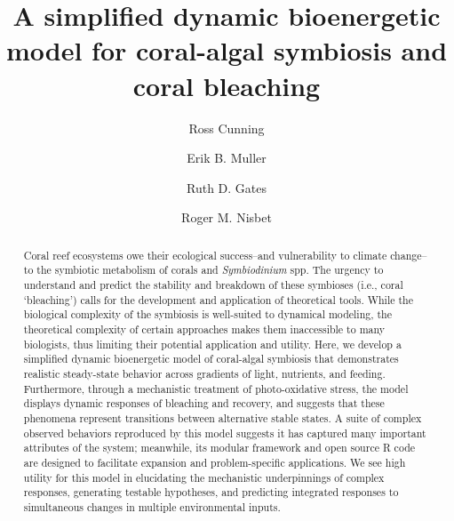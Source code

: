 \documentclass[]{elsarticle} %
\begin{document}
\begin{frontmatter}

  \title{A simplified dynamic bioenergetic model for coral-algal symbiosis and
coral bleaching}
    \author[University of Hawaii]{Ross Cunning}
    \author[University of California]{Erik B. Muller}
  
  
    \author[University of Hawaii]{Ruth D. Gates}
  
  
    \author[University of California]{Roger M. Nisbet}
  
  
      \address[University of Hawaii]{Hawaii Institute of Marine Biology, Kaneohe, HI 96744, USA}
    \address[University of California]{Department of Ecology, Evolution, and Marine Biology, Santa Barbara, CA
93106, USA}
  
  \begin{abstract}
  Coral reef ecosystems owe their ecological success--and vulnerability to
  climate change--to the symbiotic metabolism of corals and
  \emph{Symbiodinium} spp. The urgency to understand and predict the
  stability and breakdown of these symbioses (i.e., coral `bleaching')
  calls for the development and application of theoretical tools. While
  the biological complexity of the symbiosis is well-suited to dynamical
  modeling, the theoretical complexity of certain approaches makes them
  inaccessible to many biologists, thus limiting their potential
  application and utility. Here, we develop a simplified dynamic
  bioenergetic model of coral-algal symbiosis that demonstrates realistic
  steady-state behavior across gradients of light, nutrients, and feeding.
  Furthermore, through a mechanistic treatment of photo-oxidative stress,
  the model displays dynamic responses of bleaching and recovery, and
  suggests that these phenomena represent transitions between alternative
  stable states. A suite of complex observed behaviors reproduced by this
  model suggests it has captured many important attributes of the system;
  meanwhile, its modular framework and open source R code are designed to
  facilitate expansion and problem-specific applications. We see high
  utility for this model in elucidating the mechanistic underpinnings of
  complex responses, generating testable hypotheses, and predicting
  integrated responses to simultaneous changes in multiple environmental
  inputs.
  \end{abstract}
  
 \end{frontmatter}
\end{document}
